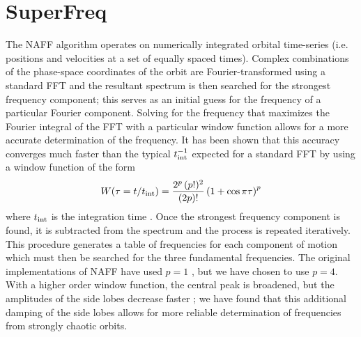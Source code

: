 \section{SuperFreq}\label{sec:naffapdx}

\renewcommand{\thefigure}{\thesection.\arabic{figure}}

The NAFF algorithm operates on numerically integrated orbital time-series (i.e.
positions and velocities at a set of equally spaced times). Complex combinations
of the phase-space coordinates of the orbit are Fourier-transformed using a
standard FFT and the resultant spectrum is then searched for the strongest
frequency component; this serves as an initial guess for the frequency of a
particular Fourier component. Solving for the frequency that maximizes the
Fourier integral of the FFT with a particular window function allows for a more
accurate determination of the frequency. It has been shown that this accuracy
converges much faster than the typical $t_{\rm int}^{-1}$ expected for a standard
FFT by using a window function of the form
\begin{equation}
	W(\tau=t/t_{\rm int}) = \frac{2^p \, (p!)^2}{(2p)!} \left( 1 + \cos \pi \tau\right)^p
\end{equation}
where $t_{\rm int}$ is the integration time \citep{laskar99}. Once the strongest
frequency component is found, it is subtracted from the spectrum and the process
is repeated iteratively. This procedure generates a table of frequencies for
each component of motion which must then be searched for the three fundamental
frequencies. The original implementations of NAFF have used $p=1$
\citep[e.g.,][]{laskar93, valluri98}, but we have chosen to use $p=4$. With a
higher order window function, the central peak is broadened, but the amplitudes
of the side lobes decrease faster \citep[see][]{hunter02}; we have found that
this additional damping of the side lobes allows for more reliable determination
of frequencies from strongly chaotic orbits.

